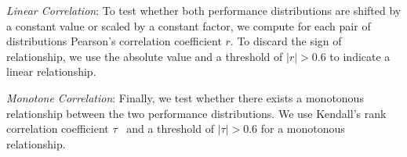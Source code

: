 \begin{compactenum}

	\item \textit{Linear Correlation}: To test whether both performance distributions are shifted by a constant value or scaled by a constant factor, we compute for each pair of distributions Pearson's correlation coefficient $r$. To discard the sign of relationship, we use the absolute value and a threshold of $\vert r\vert >0.6$ to indicate a linear relationship.
	
	\item \textit{Monotone Correlation}: Finally, we test whether there exists a monotonous relationship between the two performance distributions. We use Kendall's rank correlation coefficient $\tau$~\cite{kendall1938new} and a threshold of  $\vert\tau\vert > 0.6$ for a monotonous relationship.
\end{compactenum}
